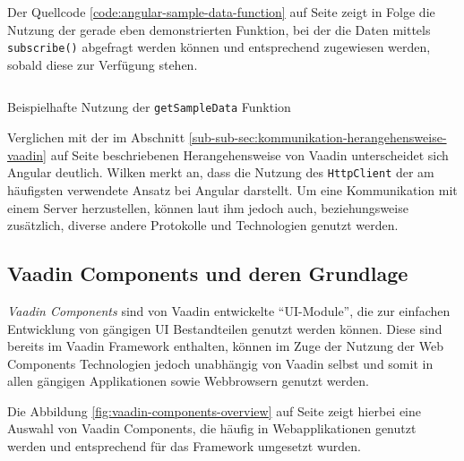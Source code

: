 \documentclass[a4paper,12pt,twoside]{scrreprt}
\begin{document}
Der Quellcode \ref{code:angular-sample-data-function} auf Seite \pageref{code:angular-sample-data-function} zeigt in Folge die Nutzung der gerade eben demonstrierten Funktion, bei der die Daten mittels \texttt{subscribe()} abgefragt werden können und entsprechend zugewiesen werden, sobald diese zur Verfügung stehen.

\begin{listing}[ht]
    \renewcommand{\fcolorbox}[4][]{#4}
    \inputminted[fontsize=\footnotesize,linenos]{js}{code/Luidold_Load-function.ts}
    \caption[Beispielhafte Nutzung der \texttt{getSampleData} Funktion]{Beispielhafte Nutzung der \texttt{getSampleData} Funktion}
    \label{code:angular-sample-data-function}
\end{listing}

Verglichen mit der im Abschnitt \ref{sub-sub-sec:kommunikation-herangehensweise-vaadin} auf Seite \pageref{sub-sub-sec:kommunikation-herangehensweise-vaadin} beschriebenen Herangehensweise von Vaadin unterscheidet sich Angular deutlich. Wilken merkt an, dass die Nutzung des \texttt{HttpClient} der am häufigsten verwendete Ansatz bei Angular darstellt. Um eine Kommunikation mit einem Server herzustellen, können laut ihm jedoch auch, beziehungsweise zusätzlich, diverse andere Protokolle und Technologien genutzt werden. \parencite[][]{wilken_angular_2018}

\subsection{Vaadin Components und deren Grundlage}
\label{sub-sec:vaadin-components}
\textit{Vaadin Components} sind von Vaadin entwickelte \enquote{\acs{UI}-Module}, die zur einfachen Entwicklung von gängigen \acl{UI} Bestandteilen genutzt werden können. Diese sind bereits im Vaadin Framework enthalten, können im Zuge der Nutzung der Web Components Technologien jedoch unabhängig von Vaadin selbst und somit in allen gängigen Applikationen sowie Webbrowsern genutzt werden. \parencite[][Seite 2ff.]{vaadin_ltd_vaadin_nodate-2}

Die Abbildung \ref{fig:vaadin-components-overview} auf Seite \pageref{fig:vaadin-components-overview} zeigt hierbei eine Auswahl von Vaadin Components, die häufig in Webapplikationen genutzt werden und entsprechend für das Framework umgesetzt wurden.
\end{document}
